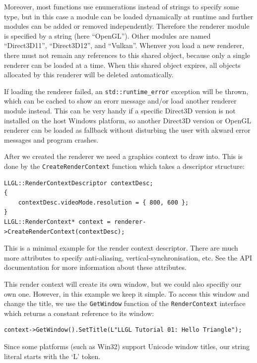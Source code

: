 \documentclass{article}
\begin{document}
Moreover, most functions use enumerations instead of strings to specify some type, but in this case
a module can be loaded dynamically at runtime and further modules can be added or removed independently.
Therefore the renderer module is specified by a string (here ``OpenGL''). Other modules are
named ``Direct3D11'', ``Direct3D12'', and ``Vulkan''.
Whenver you load a new renderer, there must not remain any references to this shared object,
because only a single renderer can be loaded at a time.
When this shared object expires, all objects allocated by this renderer will be deleted automatically.

If loading the renderer failed, an \texttt{std::runtime\_error} exception will be thrown,
which can be cached to show an erorr message and/or load another renderer module instead.
This can be very handy if a specific Direct3D version is not installed on the host Windows platform,
so another Direct3D version or OpenGL renderer can be loaded as fallback
without disturbing the user with akward error messages and program crashes.

After we created the renderer we need a graphics context to draw into.
This is done by the \texttt{CreateRenderContext} function which takes a descriptor structure:
\begin{lstlisting}
LLGL::RenderContextDescriptor contextDesc;
{
    contextDesc.videoMode.resolution = { 800, 600 };
}
LLGL::RenderContext* context = renderer->CreateRenderContext(contextDesc);
\end{lstlisting}
This is a minimal example for the render context descriptor. There are much more attributes
to specify anti-aliasing, vertical-synchronisation, etc.
See the API documentation for more information about these attributes.

This render context will create its own window, but we could also specifiy our own one.
However, in this example we keep it simple. To access this window and change the title,
we use the \texttt{GetWindow} function of the \texttt{RenderContext} interface
which returns a constant reference to its window:
\begin{lstlisting}
context->GetWindow().SetTitle(L"LLGL Tutorial 01: Hello Triangle");
\end{lstlisting}
Since some platforms (such as Win32) support Unicode window titles, our string literal starts with the `L' token.
\end{document}
